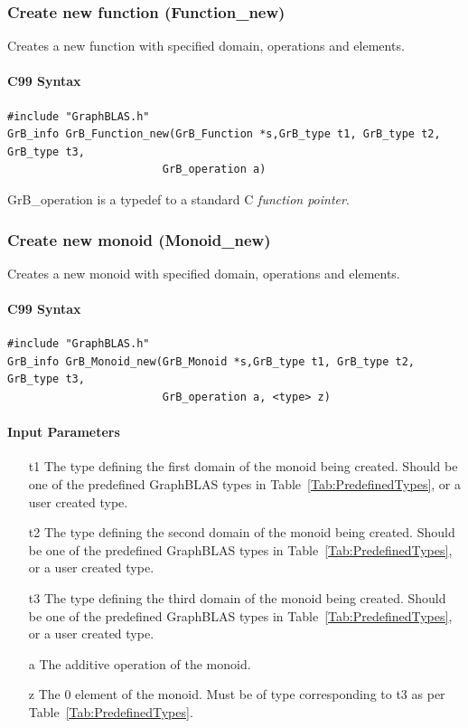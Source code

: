 \documentclass[11pt]{extarticle}
\begin{document}
\subsubsection{Create new function ({\sf Function\_new})}

Creates a new function with specified domain, operations and elements.

\paragraph{C99 Syntax}

\begin{verbatim}
#include "GraphBLAS.h"
GrB_info GrB_Function_new(GrB_Function *s,GrB_type t1, GrB_type t2, GrB_type t3,
                        GrB_operation a)
\end{verbatim}

GrB\_operation is a typedef to a standard C \emph{function pointer}.


\subsubsection{Create new monoid ({\sf Monoid\_new})}

Creates a new monoid with specified domain, operations and elements.

\paragraph{C99 Syntax}

\begin{verbatim}
#include "GraphBLAS.h"
GrB_info GrB_Monoid_new(GrB_Monoid *s,GrB_type t1, GrB_type t2, GrB_type t3,
                        GrB_operation a, <type> z)
\end{verbatim}

\paragraph{Input Parameters}

\begin{itemize}
	\item[{\sf t1}] The type defining the first domain of the monoid being created. Should be one of the predefined
	GraphBLAS types in Table~\ref{Tab:PredefinedTypes}, or a user created type.
	\item[{\sf t2}] The type defining the second domain of the monoid being created. Should be one of the predefined
	GraphBLAS types in Table~\ref{Tab:PredefinedTypes}, or a user created type.
	\item[{\sf t3}] The type defining the third domain of the monoid being created. Should be one of the predefined
	GraphBLAS types in Table~\ref{Tab:PredefinedTypes}, or a user created type.
	\item[{\sf a}] The additive operation of the monoid.
	\item[{\sf z}] The $0$ element of the monoid. Must be of type corresponding to {\sf t3} as per Table~\ref{Tab:PredefinedTypes}.
\end{itemize}
\end{document}
